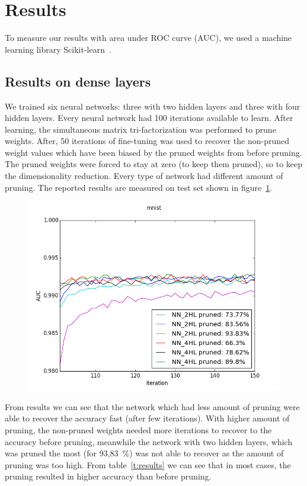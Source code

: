 \documentclass{article} %
\begin{document}
\section{Results}
To measure our results with area under ROC 
curve (AUC), we used a machine
learning library Scikit-learn~\cite{scikit-learn}.

\subsection{Results on dense layers}
We trained six neural networks: 
three with two hidden layers and three with four 
hidden layers. Every neural network had 100 iterations available to learn. After 
learning, the simultaneous matrix tri-factorization was performed to prune 
weights. After, 50 iterations of fine-tuning was used to recover the non-pruned 
weight values which have been biased by the pruned weights from before 
pruning. The pruned weights were forced to stay at zero (to keep 
them pruned), so to keep the dimensionality reduction. 
Every type of network had different amount of pruning. 
The reported results are measured  on test set 
shown in figure~\ref{f:results}. 

\begin{figure}[!ht]
\centering
\includegraphics[width=0.8\linewidth]{mnist_new.png}
\label{f:results}
\end{figure}

From results we can see 
that the network which had less amount of pruning were able to recover the 
accuracy fast (after few iterations). With higher amount of pruning, 
the non-pruned weights needed more iterations to recover to the accuracy before 
pruning, meanwhile the network with two hidden layers, which was pruned the most 
(for 93,83~\%) was not able to recover as the amount of pruning was too high.
From table~\ref{t:results} we can see that in most cases, the pruning resulted
in higher accuracy than before pruning. 
\end{document}
